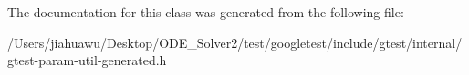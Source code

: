 The documentation for this class was generated from the following file\+:\begin{DoxyCompactItemize}
\item 
/\+Users/jiahuawu/\+Desktop/\+O\+D\+E\+\_\+\+Solver2/test/googletest/include/gtest/internal/gtest-\/param-\/util-\/generated.\+h\end{DoxyCompactItemize}
